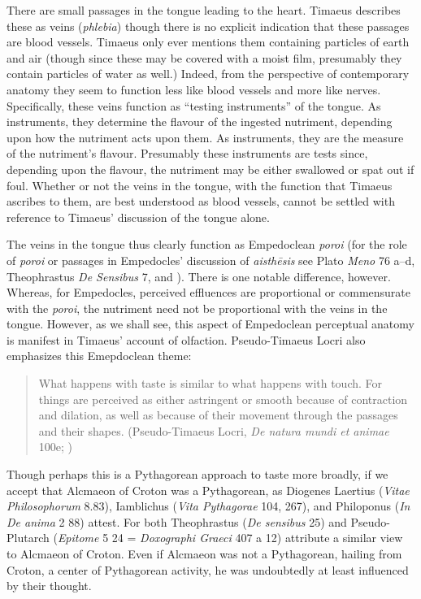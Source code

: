 There are small passages in the tongue leading to the heart. Timaeus describes these as veins (\emph{phlebia}) though there is no explicit indication that these passages are blood vessels. Timaeus only ever mentions them containing particles of earth and air (though since these may be covered with a moist film, presumably they contain particles of water as well.) Indeed, from the perspective of contemporary anatomy they seem to function less like blood vessels and more like nerves. Specifically, these veins function as ``testing instruments'' of the tongue. As instruments, they determine the flavour of the ingested nutriment, depending upon how the nutriment acts upon them. As instruments, they are the measure of the nutriment's flavour. Presumably these instruments are tests since, depending upon the flavour, the nutriment may be either swallowed or spat out if foul. Whether or not the veins in the tongue, with the function that Timaeus ascribes to them, are best understood as blood vessels, cannot be settled with reference to Timaeus' discussion of the tongue alone.

The veins in the tongue thus clearly function as Empedoclean \emph{poroi} (for the role of \emph{poroi} or passages in Empedocles' discussion of \emph{aisthēsis} see Plato \emph{Meno} 76 a--d, Theophrastus \emph{De Sensibus} 7, and \citealt{Beare:1906uq}). There is one notable difference, however. Whereas, for Empedocles, perceived effluences are proportional or commensurate with the \emph{poroi}, the nutriment need not be proportional with the veins in the tongue. However, as we shall see, this aspect of Empedoclean perceptual anatomy is manifest in Timaeus' account of olfaction. Pseudo-Timaeus Locri also emphasizes this Emepdoclean theme: 
\begin{quote}
	What happens with taste is similar to what happens with touch. For things are perceived as either astringent or smooth because of contraction and dilation, as well as because of their movement through the passages and their shapes. (Pseudo-Timaeus Locri, \emph{De natura mundi et animae} 100e; \citealt[59]{Tobin:1984qf})
\end{quote}
Though perhaps this is a Pythagorean approach to taste more broadly, if we accept that Alcmaeon of Croton was a Pythagorean, as Diogenes Laertius (\emph{Vitae Philosophorum} 8.83), Iamblichus (\emph{Vita Pythagorae} 104, 267), and Philoponus (\emph{In De anima} 2 88) attest. For both Theophrastus (\emph{De sensibus} 25) and Pseudo-Plutarch (\emph{Epitome} 5 24 = \emph{Doxographi Graeci} 407 a 12) attribute a similar view to Alcmaeon of Croton. Even if Alcmaeon was not a Pythagorean, hailing from Croton, a center of Pythagorean activity, he was undoubtedly at least influenced by their thought.


